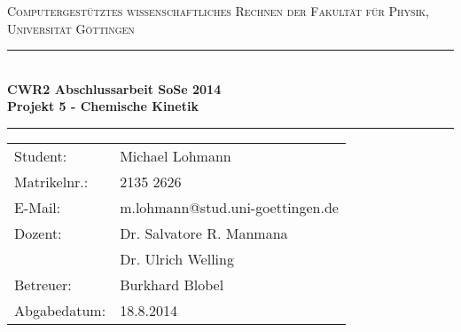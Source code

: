 \documentclass[12pt,a4paper,titlepage,headinclude,bibtotoc]{scrartcl}
\begin{document}
\begin{titlepage}
\centering
\textsc{\Large Computergestütztes wissenschaftliches Rechnen der Fakultät für
  Physik,\\[1.5ex] Universität Göttingen}

\vspace*{3.8cm}

\rule{\textwidth}{1pt}\\[0.5cm]
{\huge \bfseries
  CWR2 Abschlussarbeit SoSe 2014\\[1.5ex]
  Projekt 5 - Chemische Kinetik}\\[0.5cm]
\rule{\textwidth}{1pt}

\vspace*{3cm}

\begin{Large}
\begin{tabular}{ll}
Student: &  Michael Lohmann\\
Matrikelnr.: & 2135 2626\\
E-Mail: & m.lohmann@stud.uni-goettingen.de\\
Dozent: & Dr. Salvatore R. Manmana\\
 & Dr. Ulrich Welling\\
Betreuer: & Burkhard Blobel \\
Abgabedatum: & 18.8.2014\\
\end{tabular}
\end{Large}

\vspace*{0.8cm}

\begin{Large}
\end{Large}

\end{titlepage}

\tableofcontents

\newpage
\end{document}
